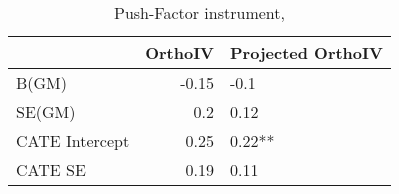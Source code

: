 \begin{table}\centering\caption{Push-Factor instrument, }\begin{tabular}{lrl}
\toprule
                &   OrthoIV & Projected OrthoIV   \\
\midrule
 B(GM)          &     -0.15 & -0.1                \\
 SE(GM)         &      0.2  & 0.12                \\
 CATE Intercept &      0.25 & 0.22**              \\
 CATE SE        &      0.19 & 0.11                \\
\bottomrule
\end{tabular}\end{table}